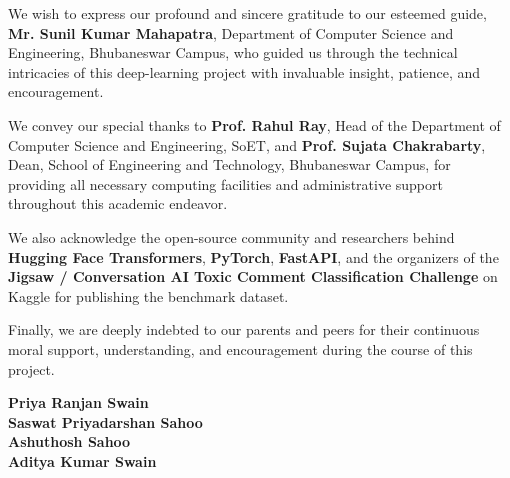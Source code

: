 \documentclass[12pt,a4paper]{article}
\begin{document}
\noindent We wish to express our profound and sincere gratitude to our esteemed guide, \textbf{Mr. Sunil Kumar Mahapatra}, Department of Computer Science and Engineering, Bhubaneswar Campus, who guided us through the technical intricacies of this deep-learning project with invaluable insight, patience, and encouragement.

\noindent We convey our special thanks to \textbf{Prof. Rahul Ray}, Head of the Department of Computer Science and Engineering, SoET, and \textbf{Prof. Sujata Chakrabarty}, Dean, School of Engineering and Technology, Bhubaneswar Campus, for providing all necessary computing facilities and administrative support throughout this academic endeavor.

\noindent We also acknowledge the open-source community and researchers behind \textbf{Hugging Face Transformers}, \textbf{PyTorch}, \textbf{FastAPI}, and the organizers of the \textbf{Jigsaw / Conversation AI Toxic Comment Classification Challenge} on Kaggle for publishing the benchmark dataset.

\noindent Finally, we are deeply indebted to our parents and peers for their continuous moral support, understanding, and encouragement during the course of this project.

\vspace{1.8cm}
\noindent
\textbf{Priya Ranjan Swain}\\
\textbf{Saswat Priyadarshan Sahoo}\\
\textbf{Ashuthosh Sahoo}\\
\textbf{Aditya Kumar Swain}
\end{document}
